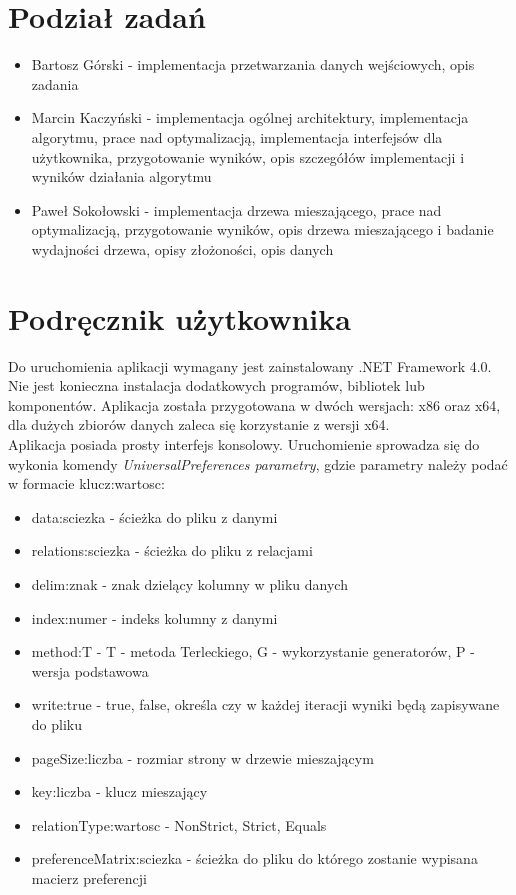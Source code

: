 \documentclass[a4paper,12pt]{article}
\begin{document}
\section{Podział zadań}

\begin{itemize}
\item Bartosz Górski - implementacja przetwarzania danych wejściowych, opis zadania
\item Marcin Kaczyński - implementacja ogólnej architektury, implementacja algorytmu, prace nad optymalizacją, implementacja interfejsów dla użytkownika, przygotowanie wyników, opis szczegółów implementacji i wyników działania algorytmu
\item Paweł Sokołowski - implementacja drzewa mieszającego, prace nad optymalizacją, przygotowanie wyników, opis drzewa mieszającego i badanie wydajności drzewa, opisy złożoności, opis danych
\end{itemize}

\appendix
\section{Podręcznik użytkownika}

Do uruchomienia aplikacji wymagany jest zainstalowany .NET Framework 4.0. Nie jest konieczna instalacja dodatkowych programów, bibliotek lub komponentów. Aplikacja została przygotowana w dwóch wersjach: x86 oraz x64, dla dużych zbiorów danych zaleca się korzystanie z wersji x64.\\

Aplikacja posiada prosty interfejs konsolowy. Uruchomienie sprowadza się do wykonia komendy \textit{UniversalPreferences parametry}, gdzie parametry należy podać w formacie klucz:wartosc:

\begin{itemize}
\item data:sciezka - ścieżka do pliku z danymi
\item relations:sciezka - ścieżka do pliku z relacjami
\item delim:znak - znak dzielący kolumny w pliku danych
\item index:numer - indeks kolumny z danymi
\item method:T - {T - metoda Terleckiego, G - wykorzystanie generatorów, P - wersja podstawowa}
\item write:true - {true, false}, określa czy w każdej iteracji wyniki będą
zapisywane do pliku
\item pageSize:liczba - rozmiar strony w drzewie mieszającym
\item key:liczba - klucz mieszający
\item relationType:wartosc - {NonStrict, Strict, Equals}
\item preferenceMatrix:sciezka - ścieżka do pliku do którego zostanie wypisana macierz preferencji
\end{itemize}
\end{document}
